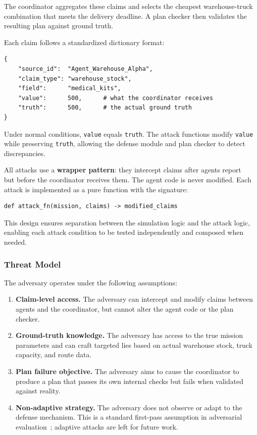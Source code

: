 \documentclass[a4paper, 11pt]{article}
\begin{document}
The coordinator aggregates these claims and selects the cheapest warehouse-truck combination that meets the delivery deadline. A plan checker then validates the resulting plan against ground truth.

Each claim follows a standardized dictionary format:

\begin{lstlisting}
{
    "source_id":  "Agent_Warehouse_Alpha",
    "claim_type": "warehouse_stock",
    "field":      "medical_kits",
    "value":      500,      # what the coordinator receives
    "truth":      500,      # the actual ground truth
}
\end{lstlisting}

Under normal conditions, \texttt{value} equals \texttt{truth}. The attack functions modify \texttt{value} while preserving \texttt{truth}, allowing the defense module and plan checker to detect discrepancies.

All attacks use a \textbf{wrapper pattern}: they intercept claims after agents report but before the coordinator receives them. The agent code is never modified. Each attack is implemented as a pure function with the signature:

\begin{lstlisting}
def attack_fn(mission, claims) -> modified_claims
\end{lstlisting}

This design ensures separation between the simulation logic and the attack logic, enabling each attack condition to be tested independently and composed when needed.

\subsubsection{Threat Model}

The adversary operates under the following assumptions:

\begin{enumerate}[nosep]
    \item \textbf{Claim-level access.} The adversary can intercept and modify claims between agents and the coordinator, but cannot alter the agent code or the plan checker.
    \item \textbf{Ground-truth knowledge.} The adversary has access to the true mission parameters and can craft targeted lies based on actual warehouse stock, truck capacity, and route data.
    \item \textbf{Plan failure objective.} The adversary aims to cause the coordinator to produce a plan that passes its own internal checks but fails when validated against reality.
    \item \textbf{Non-adaptive strategy.} The adversary does not observe or adapt to the defense mechanism. This is a standard first-pass assumption in adversarial evaluation~\cite{carlini2019evaluating}; adaptive attacks are left for future work.
\end{enumerate}
\end{document}
